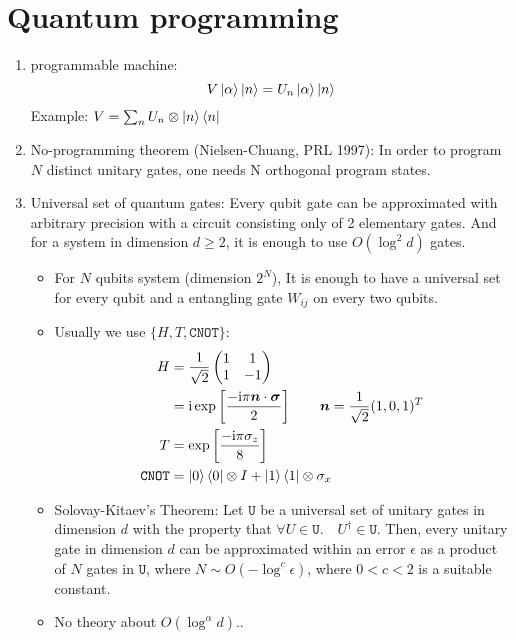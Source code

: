 \documentclass[11pt,a4paper]{article}%
\numberwithin{equation}{section}
\renewcommand*{\vec}[1]{\bm{#1}}%
\newcommand\mi{\mathrm{i}}
\begin{document}
\section{Quantum programming} %
\label{sec:quantum_programming}
\begin{enumerate}
    \item programmable machine:
    \begin{equation}
     V\ket\alpha\ket n = U_n\ket\alpha\ket n
    \end{equation}
    Example: $V = \sum_n U_n\otimes\ket n\bra n
    $
    \item No-programming theorem (Nielsen-Chuang, PRL 1997): In order to program $N$ distinct unitary gates, one needs N orthogonal program states.
    \item Universal set of quantum gates: Every qubit gate can be approximated with arbitrary precision with a circuit consisting only of 2 elementary gates. And for a system in dimension $d\ge 2$, it is enough to use $O(\log^2d)$ gates.
    \begin{itemize}
        \item For $N$ qubits system (dimension $2^N$), It is enough to have a universal set for every qubit and a entangling gate $W_{ij}$ on every two qubits.
        \item Usually we use $\{H,T,\mathtt{CNOT}\}$:
        \begin{align}
            H &= \frac{1}{\sqrt{2}}\begin{pmatrix}
            1 &1 \\
            1 &-1\end{pmatrix}\\
            &= \mi\exp\left[\frac{-\mi\pi\vec n\cdot\vec\sigma}2\right] \qquad \vec n = \frac1{\sqrt2}(1,0,1)^T \\
            T &= \exp\left[\frac{-\mi\pi\sigma_z}8\right]\\
            \mathtt{CNOT} &= \ket0\bra0\otimes I + \ket1\bra1\otimes\sigma_x
        \end{align}
        \item Solovay-Kitaev's Theorem: Let $\mathtt U$ be a universal set of unitary gates in dimension $d$ with the property that $\forall U\in\mathtt U.\quad U^\dagger\in\mathtt U$. Then, every unitary gate in dimension $d$ can be approximated within an error $\epsilon$ as a product of $N$ gates in $\mathtt U$, where $N\sim O(-\log^c\epsilon)$, where $0<c<2$ is a suitable constant.
        \item No theory about $O(\log^\alpha d)$.. 
    \end{itemize}
\end{enumerate}
\end{document}
